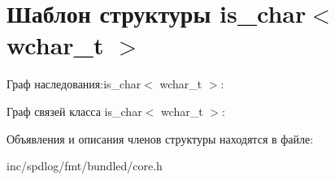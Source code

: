 \hypertarget{structis__char_3_01wchar__t_01_4}{}\section{Шаблон структуры is\+\_\+char$<$ wchar\+\_\+t $>$}
\label{structis__char_3_01wchar__t_01_4}


Граф наследования\+:is\+\_\+char$<$ wchar\+\_\+t $>$\+:


Граф связей класса is\+\_\+char$<$ wchar\+\_\+t $>$\+:


Объявления и описания членов структуры находятся в файле\+:\begin{DoxyCompactItemize}
\item 
inc/spdlog/fmt/bundled/core.\+h\end{DoxyCompactItemize}
